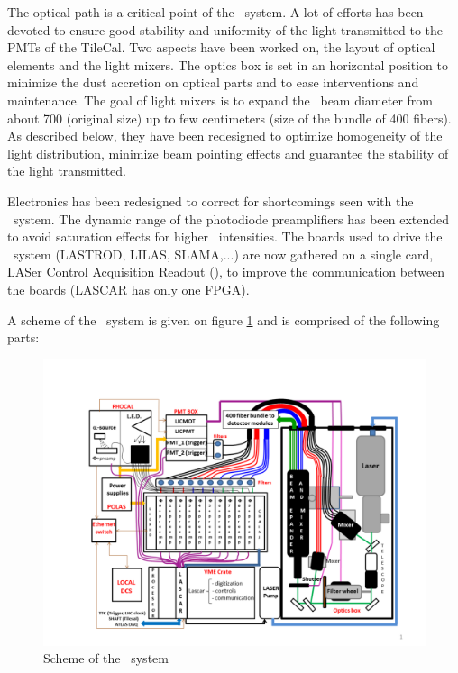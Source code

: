 \par
The optical path is a critical point of the \lasii~system. A lot of efforts has been devoted to ensure good stability and uniformity of the light transmitted to the PMTs of the TileCal. Two aspects have been worked on, the layout of optical elements and the light mixers. The optics box is set in an horizontal position to minimize the dust accretion on optical parts and to ease interventions and maintenance. The goal of light mixers is to expand the \laser~beam diameter from about 700 \mum (original size) up to few centimeters (size of the bundle of 400 fibers). As described below, they have been redesigned to optimize homogeneity of the light distribution, minimize beam pointing effects and  guarantee the stability of the light transmitted.
\par
Electronics has been redesigned to correct for shortcomings seen with the \lasi~system. The dynamic range of the photodiode preamplifiers has been extended to avoid saturation effects for higher \laser~intensities. The boards used to drive the \lasi~system (LASTROD, LILAS, SLAMA,...) are now gathered on a single card, LASer Control Acquisition Readout (\lascar), to improve the communication between the boards (LASCAR has only one FPGA).
\par
A scheme of the \lasii~system is given on figure \ref{fig:laserscheme} and is comprised of the following parts:
\begin{figure}[htbp]
\centering
\includegraphics[width=15cm]{figures/Laser_II_layout.pdf}
\caption{Scheme of the \lasii~system}\label{fig:laserscheme}
\end{figure}
